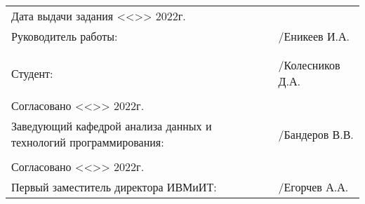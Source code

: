 \documentclass[a4paper]{article}
\begin{document}
    \vfill

    \begin{xltabular}{\textwidth} {
            >{\hsize} X
            >{\hsize} X }
        Дата выдачи задания <<\underline{\hspace{0.75cm}}>>\underline{\hspace{2.5cm}} 2022г. & \\
        Руководитель работы: & \underline{\hspace{3cm}}/Еникеев И.А. \\
        & \\
         \\
        Студент: & \underline{\hspace{3cm}}/Колесников Д.А. \\
        & \\
        Согласовано <<\underline{\hspace{0.75cm}}>>\underline{\hspace{2.5cm}} 2022г. & \\
        Заведующий кафедрой анализа данных и технологий программирования: & \underline{\hspace{3cm}}/Бандеров В.В. \\
        & \\
        Согласовано <<\underline{\hspace{0.75cm}}>>\underline{\hspace{2.5cm}} 2022г. & \\
        Первый заместитель директора ИВМиИТ: & \underline{\hspace{3cm}}/Егорчев А.А. \\
    \end{xltabular}
\end{document}
